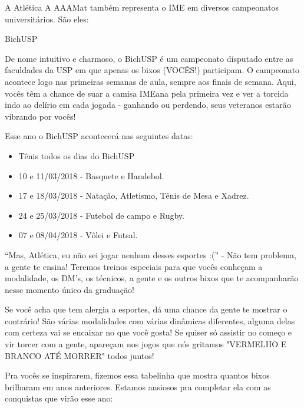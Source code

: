 \begin{secao}{A Atlética}
A AAAMat também representa o IME em diversos campeonatos universitários. São
eles:

\begin{subsecao}{BichUSP}

De nome intuitivo e charmoso, o BichUSP é um campeonato disputado entre as
faculdades da USP em que apenas os bixos (VOCÊS!) participam. O campeonato
acontece logo nas primeiras semanas de aula, sempre aos finais de semana. Aqui,
vocês têm a chance de suar a camisa IMEana pela primeira vez e ver a torcida
indo ao delírio em cada jogada - ganhando ou perdendo, seus veteranos estarão
vibrando por vocês!

Esse ano o BichUSP acontecerá nas seguintes datas:

\begin{itemize}
  \item Tênis todos os dias do BichUSP
  \item 10 e 11/03/2018 - Basquete e Handebol.
  \item 17 e 18/03/2018 - Natação, Atletismo, Tênis de Mesa e Xadrez.
  \item 24 e 25/03/2018 - Futebol de campo e Rugby.
  \item 07 e 08/04/2018 - Vôlei e Futsal.
\end{itemize}

``Mas, Atlética, eu não sei jogar nenhum desses esportes :('' - Não tem
problema, a gente te ensina! Teremos treinos especiais para que vocês conheçam
a modalidade, os DM’s, os técnicos, a gente e os outros bixos que te
acompanharão nesse momento único da graduação!

Se você acha que tem alergia a esportes, dá uma chance da gente te mostrar o
contrário! São várias modalidades com várias dinâmicas diferentes, alguma delas
com certeza vai se encaixar no que você gosta! Se quiser só assistir no começo
e vir torcer com a gente, apareçam nos jogos que nós gritamos "VERMELHO E
BRANCO ATÉ MORRER" todos juntos!

Pra vocês se inspirarem, fizemos essa tabelinha que mostra quantos bixos
brilharam em anos anteriores. Estamos ansiosos pra completar ela com as
conquistas que virão esse ano:


\end{subsecao}
\end{secao}
